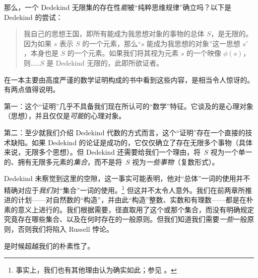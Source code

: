 \documentclass[../../../include/open-logic-section]{subfiles}
\begin{document}
那么，一个 Dedekind 无限集的存在性\emph{能}被“纯粹思维规律”确立吗？以下是 Dedekind 的尝试：

\begin{quote}
  我自己的思想王国，即所有能成为我思想对象的事物的总体 $S$，是无限的。因为如果 $s$ 表示 $S$ 的一个元素，那么“$s$ 能成为我思想的对象”这一思想 $s'$，本身也是 $S$ 的一个元素。如果我们将其视为元素 $s$ 的一个映像 $\phi(s)$，则……$S$ 是 Dedekind 无限的，此即所欲证者。\citep[\S66]{Dedekind1888}
\end{quote}

在一本主要由高度严谨的数学证明构成的书中看到这些内容，是相当令人惊讶的。有两点值得说明。

第一：这个“证明”几乎不具备我们现在所认可的“数学”特征。它谈及的是心理对象（思想），并且仅仅是\emph{可能}的心理对象。

第二：至少就我们介绍 Dedekind 代数的方式而言，这个“证明”存在一个直接的技术缺陷。如果 Dedekind 的论证是成功的，它仅仅确立了存在无限多个事物（具体来说，无限多个思想）。但 Dedekind 还需要给我们一个理由，将~$S$ 视为一个单一的、拥有无限多元素的\emph{集合}，而不是将~$S$ 视为\emph{一些事物}（复数形式）。

Dedekind 未察觉到这里的空隙，这一事实可能表明，他对“总体”一词的使用并不精确对应于\emph{我们}对“集合”一词的使用。\footnote{事实上，我们也有其他理由认为确实如此；参见 \citet[p.~23]{Potter2004}。} 但这并不太令人意外。我们在前两章所推进的计划——对自然数的“构造”，并由此“构造”整数、实数和有理数——都是在朴素的意义上进行的。我们根据需要，径直取用了这个或那个集合，而没有明确规定究竟存在哪些集合、以及在何时存在的一般原则。但我们知道我们需要\emph{一些}一般原则，否则我们将陷入 Russell 悖论。

是时候超越我们的朴素性了。
\end{document}
